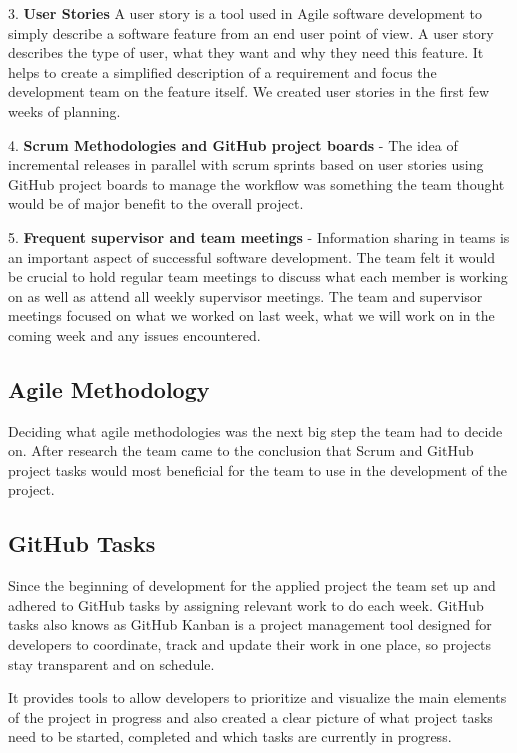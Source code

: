 3. \textbf{User Stories}
A user story is a tool used in Agile software development to simply describe a software feature from an end user point of view. A user story describes the type of user, what they want and why they need this feature. It helps to create a simplified description of a requirement and focus the development team on the feature itself. We created user stories in the first few weeks of planning.

4. \textbf{Scrum Methodologies and GitHub project boards } - The idea of incremental releases in parallel with scrum sprints based on user stories using GitHub project boards to manage the workflow was something the team thought would be of major benefit to the overall project.

5. \textbf{Frequent supervisor and team meetings} - Information sharing in teams is an important aspect of successful software development. The team felt it would be crucial to hold regular team meetings to discuss what each member is working on as well as attend all weekly supervisor meetings. The team and supervisor meetings focused on what we worked on last week, what we will work on in the coming week and any issues encountered.

\subsection{Agile Methodology}
Deciding what agile methodologies was the next big step the team had to decide on. After research the team came to the conclusion that Scrum and GitHub project tasks would most beneficial for the team to use in the development of the project.


\subsection{GitHub Tasks}
Since the beginning of development for the applied project the team set up and adhered to GitHub tasks by assigning relevant work to do each week. GitHub tasks also knows as GitHub Kanban is a project management tool designed for developers to coordinate, track and update their work in one place, so projects stay transparent and on schedule.

\vspace{5mm} %


It provides tools to allow developers to prioritize and visualize the main elements of the project in progress and also created a clear picture of what project tasks need to be started, completed and which tasks are currently in progress.\cite{GitHubtasks}

